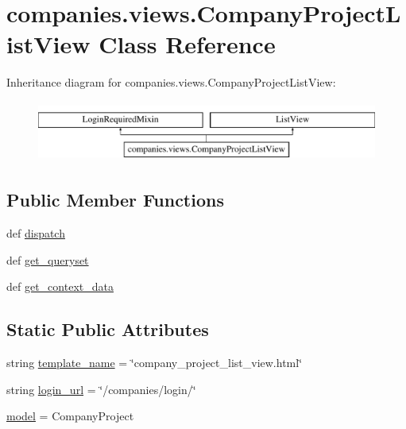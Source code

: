 \hypertarget{classcompanies_1_1views_1_1_company_project_list_view}{\section{companies.\-views.\-Company\-Project\-List\-View Class Reference}
\label{classcompanies_1_1views_1_1_company_project_list_view}
}
Inheritance diagram for companies.\-views.\-Company\-Project\-List\-View\-:\begin{figure}[H]
\begin{center}
\leavevmode
\includegraphics[height=2.000000cm]{classcompanies_1_1views_1_1_company_project_list_view}
\end{center}
\end{figure}
\subsection*{Public Member Functions}
\begin{DoxyCompactItemize}
\item 
def \hyperlink{classcompanies_1_1views_1_1_company_project_list_view_a5704b9523da1a406c41b73119b125cce}{dispatch}
\item 
def \hyperlink{classcompanies_1_1views_1_1_company_project_list_view_a8652df7640469d406468a8d894b2ff70}{get\-\_\-queryset}
\item 
def \hyperlink{classcompanies_1_1views_1_1_company_project_list_view_a46c193e21cf2051b8cf426ead5cda5d1}{get\-\_\-context\-\_\-data}
\end{DoxyCompactItemize}
\subsection*{Static Public Attributes}
\begin{DoxyCompactItemize}
\item 
string \hyperlink{classcompanies_1_1views_1_1_company_project_list_view_a8b8cdbbe6c489f5fa3fa70283413eaf3}{template\-\_\-name} = \char`\"{}company\-\_\-project\-\_\-list\-\_\-view.\-html\char`\"{}
\item 
string \hyperlink{classcompanies_1_1views_1_1_company_project_list_view_a4b48a72c216bade4e3c45c81b1e7d578}{login\-\_\-url} = \char`\"{}/companies/login/\char`\"{}
\item 
\hyperlink{classcompanies_1_1views_1_1_company_project_list_view_a01f8b6cc0240cc87276ac9e2b3b126e1}{model} = Company\-Project
\end{DoxyCompactItemize}



